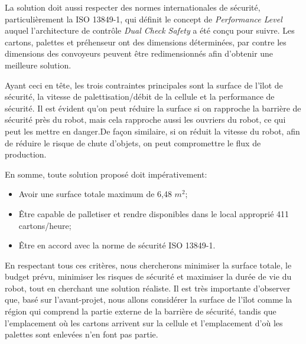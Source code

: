 La solution doit aussi respecter des normes internationales de sécurité, particulièrement la ISO 13849-1, qui définit le concept de \textit{Performance Level} auquel l'architecture de contrôle \textit{Dual Check Safety} a été conçu pour suivre.
Les cartons, palettes et préhenseur ont des dimensions déterminées, par contre les dimensions des convoyeurs peuvent être redimensionnés afin d’obtenir une meilleure solution. \par
Ayant ceci en tête, les trois contraintes principales sont la surface de l’îlot de sécurité, la vitesse de palettisation/débit de la cellule et la performance de sécurité. Il est évident qu’on peut réduire la surface si on rapproche la barrière de sécurité près du robot, mais cela rapproche aussi les ouvriers du robot, ce qui peut les mettre en danger.\newpage De façon similaire, si on réduit la vitesse du robot, afin de réduire le risque de chute d’objets, on peut compromettre le flux de production.    



En somme, toute solution proposé doit impérativement:
\begin{itemize}
\item Avoir une surface totale maximum de 6,48 $m^2$;
\item Être capable de palletiser et rendre disponibles dans le local approprié 411 cartons/heure; 
\item Être en accord avec la norme de sécurité ISO 13849-1. 

\end{itemize}
En respectant tous ces critères, nous chercherons minimiser la surface totale, le budget prévu, minimiser les risques de sécurité et maximiser la durée de vie du robot, tout en cherchant une solution réaliste.
Il est très importante d’observer que, basé sur l’avant-projet, nous allons considérer la surface de l’îlot comme la région qui comprend la partie externe de la barrière de sécurité, tandis que l’emplacement où les cartons arrivent sur la cellule et l’emplacement d’où les palettes sont enlevées n’en font pas partie. 